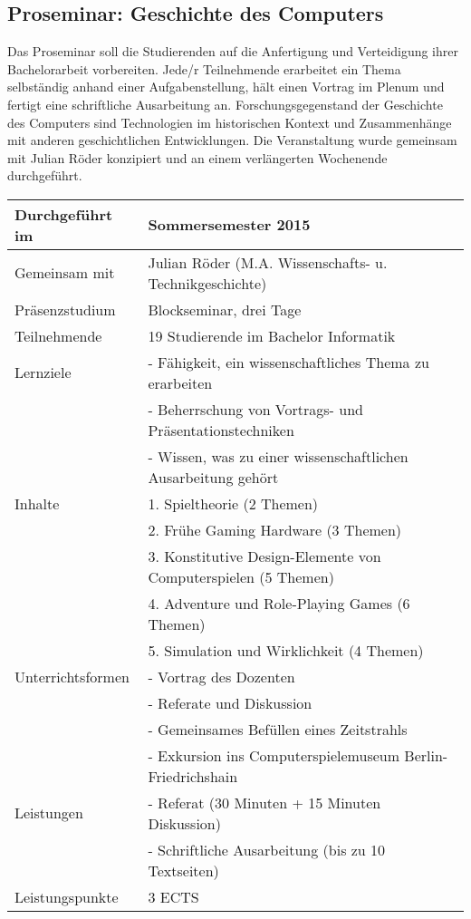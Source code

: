 \documentclass[11pt,ngerman]{article}
\begin{document}
\subsection{Proseminar: Geschichte des Computers}
Das Proseminar soll die Studierenden auf die Anfertigung und Verteidigung ihrer Bachelorarbeit vorbereiten. Jede/r Teilnehmende erarbeitet ein Thema selbständig anhand einer Aufgabenstellung, hält einen Vortrag im Plenum und fertigt eine schriftliche Ausarbeitung an. Forschungsgegenstand der Geschichte des Computers sind Technologien im historischen Kontext und Zusammenhänge mit anderen geschichtlichen Entwicklungen. Die Veranstaltung wurde gemeinsam mit Julian Röder konzipiert und an einem verlängerten Wochenende durchgeführt.
\noindent \begin{longtable}{ l | p{11.5cm} }
  \hline			
    Durchgeführt im & Sommersemester 2015 \\ 
  \hline
    Gemeinsam mit & Julian Röder (M.A. Wissenschafts- u. Technikgeschichte)\\
  \hline
    Präsenzstudium & Blockseminar, drei Tage \\ 
  \hline
    Teilnehmende & 19 Studierende im Bachelor Informatik \\ 
  \hline
    Lernziele & - Fähigkeit, ein wissenschaftliches Thema zu erarbeiten\\[-2mm]
        & - Beherrschung von Vortrags- und Präsentationstechniken\\[-2mm]
        & - Wissen, was zu einer wissenschaftlichen Ausarbeitung gehört\\
  \hline
    Inhalte & 1. Spieltheorie (2 Themen)\\[-2mm]
        & 2. Frühe Gaming Hardware (3 Themen)\\[-2mm]
        & 3. Konstitutive Design-Elemente von Computerspielen (5 Themen)\\[-2mm]
        & 4. Adventure und Role-Playing Games (6 Themen)\\[-2mm]
        & 5. Simulation und Wirklichkeit (4 Themen)\\
  \hline
  Unterrichtsformen & - Vortrag des Dozenten\\[-2mm]
  & - Referate und Diskussion\\[-2mm]
  & - Gemeinsames Befüllen eines Zeitstrahls\\[-2mm]
  & - Exkursion ins Computerspielemuseum Berlin-Friedrichshain\\
  \hline
  Leistungen & - Referat (30 Minuten + 15 Minuten Diskussion)\\[-2mm]
  & - Schriftliche Ausarbeitung (bis zu 10 Textseiten)\\
  \hline
  Leistungspunkte & 3 ECTS\\
\end{longtable}
\end{document}
